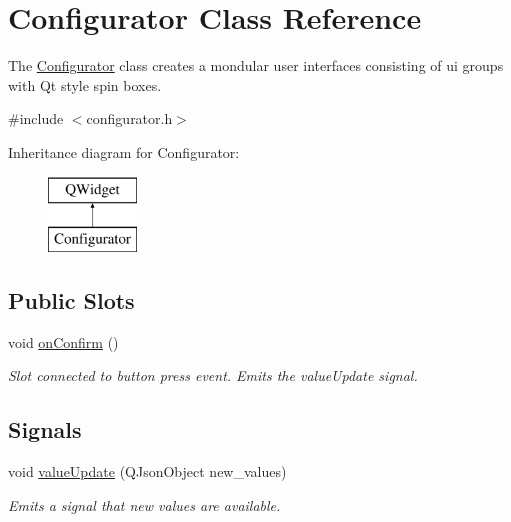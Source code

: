 \hypertarget{class_configurator}{}\section{Configurator Class Reference}
\label{class_configurator}


The \mbox{\hyperlink{class_configurator}{Configurator}} class creates a mondular user interfaces consisting of ui groups with Qt style spin boxes.  




{\ttfamily \#include $<$configurator.\+h$>$}

Inheritance diagram for Configurator\+:\begin{figure}[H]
\begin{center}
\leavevmode
\includegraphics[height=2.000000cm]{class_configurator}
\end{center}
\end{figure}
\subsection*{Public Slots}
\begin{DoxyCompactItemize}
\item 
\mbox{\label{class_configurator_a80a4e2988400839fe550f87fc3681cbb}} 
void \mbox{\hyperlink{class_configurator_a80a4e2988400839fe550f87fc3681cbb}{on\+Confirm}} ()
\begin{DoxyCompactList}\small\item\em Slot connected to button press event. Emits the value\+Update signal. \end{DoxyCompactList}\end{DoxyCompactItemize}
\subsection*{Signals}
\begin{DoxyCompactItemize}
\item 
void \mbox{\hyperlink{class_configurator_ab558c7a35d9d766fe3a7ae80326223f0}{value\+Update}} (Q\+Json\+Object new\+\_\+values)
\begin{DoxyCompactList}\small\item\em Emits a signal that new values are available. \end{DoxyCompactList}\end{DoxyCompactItemize}
